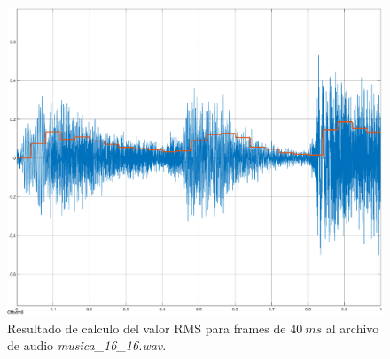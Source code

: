\begin{figure}[H]
    \centering
    \includegraphics[scale = 0.4]{Figuras/rms40ms.eps}
    \caption{Resultado de calculo del valor RMS para frames de $40~ms$ al archivo de audio \textit{musica\_16\_16.wav}.}
    \label{envolve40ms}
\end{figure}